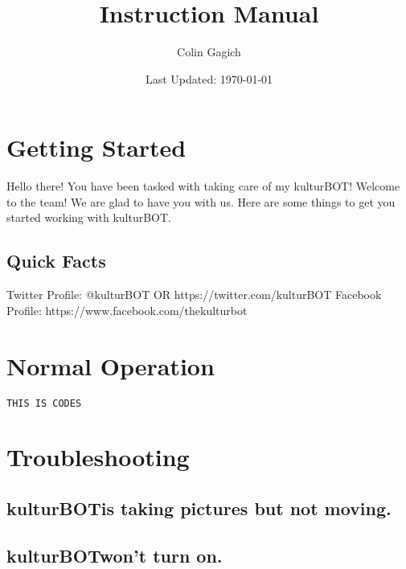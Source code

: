 \documentclass[]{article}
\title{\kbspace Instruction Manual}
\author{Colin Gagich}
\date{Last Updated: \today}
\newcommand{\kb}{kulturBOT}
\newcommand{\kbspace}{\kb \space}
\newcommand{\mykb}{my \kb}
\begin{document}
\maketitle

\newpage

\tableofcontents
\newpage

\section{Getting Started}
Hello there! You have been tasked with taking care of \mykb! Welcome to the team! We are glad to have you with us. Here are some things to get you started working with \kb.

\subsection{Quick Facts}


Twitter Profile: @kulturBOT OR https://twitter.com/kulturBOT
Facebook Profile: https://www.facebook.com/thekulturbot

\section{Normal Operation}

\begin{lstlisting}[frame=single]
THIS IS CODES
\end{lstlisting}

\section{Troubleshooting}
\subsection{\kbspace is taking pictures but not moving.}
\subsection{\kbspace won't turn on.}
\end{document}
